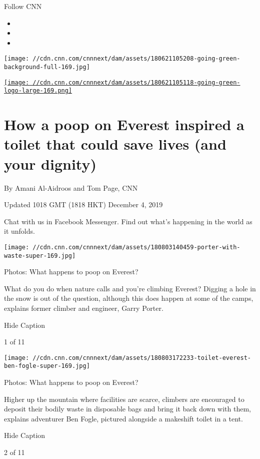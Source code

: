 Follow CNN

\begin{itemize}
\item
\item
\item
\end{itemize}

\texttt{[image: //cdn.cnn.com/cnnnext/dam/assets/180621105208-going-green-background-full-169.jpg]}

\href{/specials/world/goinggreen}{\texttt{[image: //cdn.cnn.com/cnnnext/dam/assets/180621105118-going-green-logo-large-169.png]}}

\hypertarget{how-a-poop-on-everest-inspired-a-toilet-that-could-save-lives-and-your-dignity}{%
\section{How a poop on Everest inspired a toilet that could save lives
(and your
dignity)}\label{how-a-poop-on-everest-inspired-a-toilet-that-could-save-lives-and-your-dignity}}

By Amani Al-Aidroos and Tom Page, CNN

Updated 1018 GMT (1818 HKT) December 4, 2019

Chat with us in Facebook Messenger. Find out what's happening in the
world as it unfolds.

\texttt{[image: //cdn.cnn.com/cnnnext/dam/assets/180803140459-porter-with-waste-super-169.jpg]}

Photos: What happens to poop on Everest?

What do you do when nature calls and you're climbing Everest? Digging a
hole in the snow is out of the question, although this does happen at
some of the camps, explains former climber and engineer, Garry Porter.

Hide Caption

1 of 11

\texttt{[image: //cdn.cnn.com/cnnnext/dam/assets/180803172233-toilet-everest-ben-fogle-super-169.jpg]}

Photos: What happens to poop on Everest?

Higher up the mountain where facilities are scarce, climbers are
encouraged to deposit their bodily waste in disposable bags and bring it
back down with them, explains adventurer Ben Fogle, pictured alongside a
makeshift toilet in a tent.

Hide Caption

2 of 11

